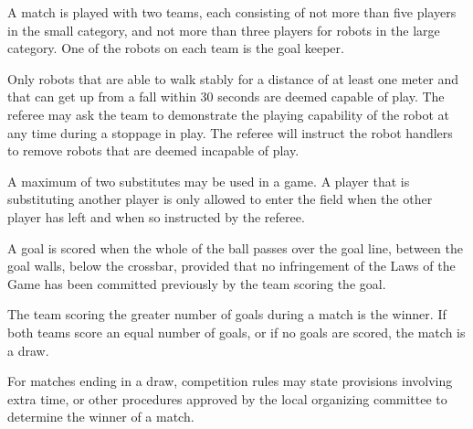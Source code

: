\documentclass[12pt]{hurocup}
\begin{document}

\begin{lawlist}[US]
\item A match is played with two teams, each consisting of not more
  than five players in the small category, and not more than three
  players for robots in the large category. One of the robots on each
  team is the goal keeper.

\item Only robots that are able to walk stably for a distance of at
  least one meter and that can get up from a fall within 30 seconds
  are deemed capable of play. The referee may ask the team to
  demonstrate the playing capability of the robot at any time during a
  stoppage in play. The referee will instruct the robot handlers to
  remove robots that are deemed incapable of play.

\item A maximum of two substitutes may be used in a game. A player
  that is substituting another player is only allowed to enter the
  field when the other player has left and when so instructed by the
  referee.

\end{lawlist}

\label{law:scoring}

\begin{lawlist}[US]
  
\item A goal is scored when the whole of the ball passes over the goal
  line, between the goal walls, below the crossbar, provided that no
  infringement of the Laws of the Game has been committed previously
  by the team scoring the goal.
  
\item The team scoring the greater number of goals during a match is
  the winner. If both teams score an equal number of goals, or if no
  goals are scored, the match is a draw.
  
\item For matches ending in a draw, competition rules may state
  provisions involving extra time, or other procedures approved by the
  local organizing committee to determine the winner of a match.
\end{lawlist}

\label{law:penalties}
\end{document}
